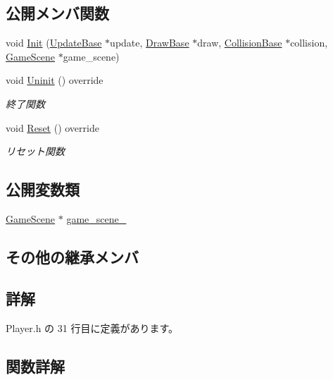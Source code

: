 \subsection*{公開メンバ関数}
\begin{DoxyCompactItemize}
\item 
void \mbox{\hyperlink{class_player_a171167a4b1a6dddbe94b8f3c6f7462c4}{Init}} (\mbox{\hyperlink{class_update_base}{Update\+Base}} $\ast$update, \mbox{\hyperlink{class_draw_base}{Draw\+Base}} $\ast$draw, \mbox{\hyperlink{class_collision_base}{Collision\+Base}} $\ast$collision, \mbox{\hyperlink{class_game_scene}{Game\+Scene}} $\ast$game\+\_\+scene)
\item 
void \mbox{\hyperlink{class_player_a7455a83ac23d2f5e0cce0ddd7d92db0c}{Uninit}} () override
\begin{DoxyCompactList}\small\item\em 終了関数 \end{DoxyCompactList}\item 
void \mbox{\hyperlink{class_player_a457153d0edd58932e37e1356f5fe5fed}{Reset}} () override
\begin{DoxyCompactList}\small\item\em リセット関数 \end{DoxyCompactList}\end{DoxyCompactItemize}
\subsection*{公開変数類}
\begin{DoxyCompactItemize}
\item 
\mbox{\hyperlink{class_game_scene}{Game\+Scene}} $\ast$ \mbox{\hyperlink{class_player_ab41e7ebf6f975f2eea365923bc2dca7f}{game\+\_\+scene\+\_\+}}
\end{DoxyCompactItemize}
\subsection*{その他の継承メンバ}


\subsection{詳解}


 Player.\+h の 31 行目に定義があります。



\subsection{関数詳解}
\mbox{\label{class_player_a171167a4b1a6dddbe94b8f3c6f7462c4}} 
